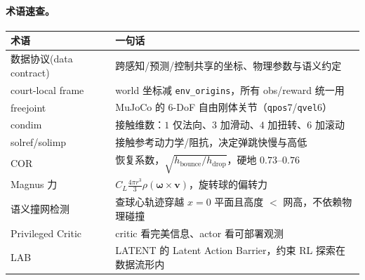 \paragraph{术语速查。}
\begin{center}
\small
\begin{tabular}{@{}ll@{}}
\toprule
术语 & 一句话 \\
\midrule
数据协议(data contract) & 跨感知/预测/控制共享的坐标、物理参数与语义约定 \\
court-local frame & world 坐标减 \verb|env_origins|，所有 obs/reward 统一用 \\
freejoint & MuJoCo 的 $6$-DoF 自由刚体关节（\verb|qpos|7/\verb|qvel|6） \\
condim & 接触维数：$1$ 仅法向、$3$ 加滑动、$4$ 加扭转、$6$ 加滚动 \\
solref/solimp & 接触参考动力学/阻抗，决定弹跳快慢与高低 \\
COR & 恢复系数，$\sqrt{h_{\text{bounce}}/h_{\text{drop}}}$，硬地 $0.73$--$0.76$ \\
Magnus 力 & $C_L\frac{4\pi r^3}{3}\rho(\boldsymbol\omega\times\mathbf v)$，旋转球的偏转力 \\
语义撞网检测 & 查球心轨迹穿越 $x=0$ 平面且高度 $<$ 网高，不依赖物理碰撞 \\
Privileged Critic & critic 看完美信息、actor 看可部署观测 \\
LAB & LATENT 的 Latent Action Barrier，约束 RL 探索在数据流形内 \\
\bottomrule
\end{tabular}
\end{center}

